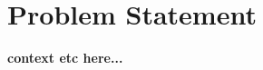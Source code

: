 \section{Problem Statement}
\textbf{context etc here...}
\begin{comment}
\textbf{context:}
Advances in hardware and manufacturing have made autonomous and semi-autonomous robots more available. Use in industry and even general public has increased. Full autonomous robots are still limited to structured environments and tasks such as in factories and warehouses.
Before robots can operate autonomously in unstructured environments, new sensor models are required to more effectively observe and represent complex environment states. \textbf{TODO:} \textit{Why are new sensor models required? Check if this is covered in literature review. If not, need to expand on this.}

\textbf{problem/lacking:}
One method of estimating the state of the environment is to use a state observer. The majority of observer implementations do not take into account the natural symmetries of the dynamics of the state. Doing so has shown to be beneficial in both the design of observers, and improved convergence properties.
However, these invariant observer methods are still limited to finite dimensional systems. In many implementations involving infinite-dimensional systems, the system is discretised to a finite dimensional one prior to observer design.  \textbf{TODO:} \textit{How does this influence performance?}

What is needed is a theory of infinite dimensional, symmetry preserving observers, + design principles.

\textbf{what will this theory provide?:}
This theory will simplify invariant observer design for infinite dimensional systems. Only discretising after observer design will maximise the potential of dense sensors. This will allow for more accurate and fast estimation of complex environments,

\textbf{approach:}
This project aims to develop some of this theory. The approach taken will be to design an invariant observer for a specific infinite dimensional system, before generalising the results.
\end{comment}

